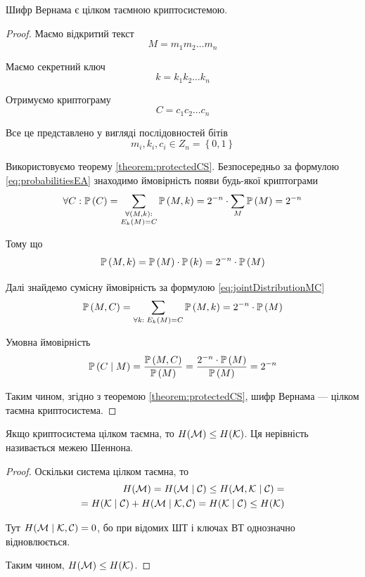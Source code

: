 \begin{theorem}
    Шифр Вернама є цілком таємною криптосистемою.
\end{theorem}
\begin{proof}
    Маємо відкритий текст
    $$M = m_1 m_2 \dots m_n$$

    Маємо секретний ключ
    $$k = k_1 k_2 \dots k_n$$

    Отримуємо криптограму
    $$C = c_1 c_2 \dots c_n$$

    Все це представлено у вигляді послідовностей бітів
    $$m_i, k_i, c_i \in Z_n = \left\{ 0, 1 \right\}$$

    Використовуємо теорему \ref{theorem:protectedCS}. Безпосередньо за формулою
    \ref{eq:probabilitiesEA} знаходимо ймовірність появи будь-якої криптограми
    $$\forall C: \mathbb{P}\left( C \right)
        = \sum_{\substack{\forall \left( M, k \right):\\
                E_k\left( M \right) = C}} \mathbb{P}\left( M, k \right)
        = 2^{-n} \cdot \sum_{M} \mathbb{P}\left( M \right) = 2^{-n}$$

    Тому що
    $$\mathbb{P}\left( M, k \right)
        = \mathbb{P}\left( M \right) \cdot \mathbb{P}\left( k \right)
        = 2^{-n} \cdot \mathbb{P}\left( M \right)$$

    Далі знайдемо сумісну ймовірність за формулою \ref{eq:jointDistributionMC}
    $$\mathbb{P}\left( M, C \right)
        = \sum_{\forall k:\;E_k\left( M \right) = C} \mathbb{P}\left( M, k \right)
        = 2^{-n} \cdot \mathbb{P}\left( M \right)$$

    Умовна ймовірність
    $$\mathbb{P}\left( C \;\middle|\; M \right)
        = \frac{\mathbb{P}\left( M, C \right)}{\mathbb{P}\left( M \right)}
        = \frac{2^{-n} \cdot \mathbb{P}\left( M \right)}{\mathbb{P}\left( M \right)}
        = 2^{-n}$$


    Таким чином, згідно з теоремою \ref{theorem:protectedCS}, шифр Вернама ---
    цілком таємна криптосистема.
\end{proof}

\begin{theorem}[Шеннон]\label{theorem:Shennon}
    Якщо криптосистема цілком таємна, то
    $H\!\left( \mathcal{M} \right) \le H\!\left( \mathcal{K} \right)$.
    Ця нерівність називається межею Шеннона.
\end{theorem}
\begin{proof}
    Оскільки система цілком таємна, то
    \begin{align*}
        H\!\left( \mathcal{M} \right)
            = H\!\left( \mathcal{M} \;\middle|\; \mathcal{C} \right)
            \le H\!\left( \mathcal{M}, \mathcal{K} \;\middle|\; \mathcal{C} \right) = \\
            = H\!\left( \mathcal{K} \;\middle|\; \mathcal{C} \right)
                + H\!\left( \mathcal{M} \;\middle|\; \mathcal{K}, \mathcal{C} \right)
            = H\!\left( \mathcal{K} \;\middle|\; \mathcal{C} \right)
            \le H\!\left( \mathcal{K} \right)
    \end{align*}

    Тут $H\!\left( \mathcal{M} \;\middle|\; \mathcal{K}, \mathcal{C} \right) = 0$, бо при
    відомих ШТ і ключах ВТ однозначно відновлюється. 

    Таким чином, $H\!\left( \mathcal{M} \right) \le H\!\left( \mathcal{K} \right)$.
\end{proof}

